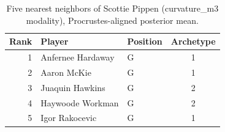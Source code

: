 \begin{table}[htbp]
  \centering\small
  \begin{tabular}{rllc}
    \toprule
    Rank & Player & Position & Archetype \\
    \midrule
    1 & Anfernee Hardaway & G & 1 \\
    2 & Aaron McKie & G & 1 \\
    3 & Juaquin Hawkins & G & 2 \\
    4 & Haywoode Workman & G & 2 \\
    5 & Igor Rakocevic & G & 1 \\
    \bottomrule
  \end{tabular}
  \caption{Five nearest neighbors of Scottie Pippen (curvature_m3 modality), Procrustes-aligned posterior mean.}
  \label{tab:Scottie_Pippen_neighbors_curvature_m3}
\end{table}


